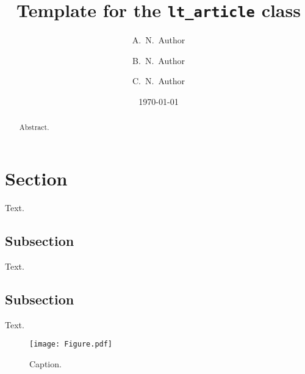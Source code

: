 \documentclass[a4paper, 11pt]{lt_article}
\title{Template for the \texttt{lt\_article} class}
\author[a,\corrmark]{A.~N.~Author}
\author[a,b]{B.~N.~Author}
\author[c]{C.~N.~Author}
\affiliation{Institution 1}
\affiliation{Institution 2}
\affiliation{Institution 3}
\date{\today}
\begin{document}
\maketitle
\printAffiliations

\begin{abstract} %

    Abstract.

\end{abstract} %
\section{Section} %
\label{sec:Section}

Text.

\subsection{Subsection} %

Text.

\subsection{Subsection} %

Text.


\begin{figure}[htbp] %
\centering
\texttt{[image: Figure.pdf]}
\caption{
    Caption.
}
\label{fig:Figure}
\end{figure} %


\newrefcontext[sorting=nyt]
\printbibliography
\newrefcontext[sorting=ynt]

\end{document}
